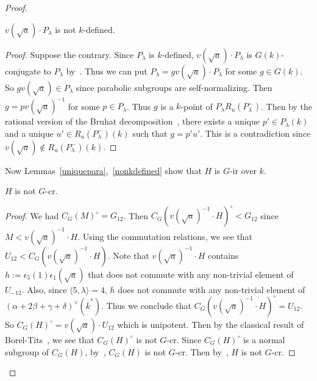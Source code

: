 \begin{proof}
\begin{lem}\label{nonkdefined}
$v(\sqrt a)\cdot P_\lambda$ is not $k$-defined.
\end{lem}
\begin{proof}
Suppose the contrary. Since $P_\lambda$ is $k$-defined, $v(\sqrt a)\cdot P_\lambda$ is $G(k)$-conjugate to $P_\lambda$ by~\cite[Thm.~20.9]{Borel-AG-book}. Thus we can put $P_\lambda=g v(\sqrt a)\cdot P_\lambda$ for some $g\in G(k)$. So $g v(\sqrt a)\in P_\lambda$ since parabolic subgroups are self-normalizing. Then $g=pv(\sqrt a)^{-1}$ for some $p\in P_\lambda$. Thus $g$ is a $k$-point of $P_\lambda R_u(P_\lambda^{-})$. Then by the rational version of the Bruhat decomposition~\cite[Thm.~21.15]{Borel-AG-book}, there exists a unique $p'\in P_\lambda(k)$ and a unique $u'\in R_u(P_\lambda^{-})(k)$ such that $g=p' u'$. This is a contradiction since $v(\sqrt a)\notin R_u(P_\lambda^{-})(k)$. 
\end{proof} 
Now Lemmas~\ref{uniquepara},~\ref{nonkdefined} show that $H$ is $G$-ir over $k$. 

\begin{lem}\label{nonG-cr}
$H$ is not $G$-cr. 
\end{lem}
\begin{proof}
We had $C_G(M)^{\circ}=G_{12}$. Then $C_G(v(\sqrt a)^{-1}\cdot H)^{\circ}<G_{12}$ since $M<v(\sqrt a)^{-1}\cdot H$. Using the commutation relations, we see that $U_{12}< C_G(v(\sqrt a)^{-1}\cdot H)$. Note that $v(\sqrt a)^{-1}\cdot H$ contains $h:=\epsilon_{5}(1)\epsilon_{1}(\sqrt a)$ that does not commute with any non-trivial element of $U_{-12}$. Also, since $\langle 5, \lambda\rangle = 4$,  $h$ does not commute with any non-trivial element of $(\alpha+2\beta+\gamma+\delta)^{\vee}(\overline k^*)$.
Thus we conclude that $C_G(v(\sqrt a)^{-1}\cdot H)^{\circ}=U_{12}$. So $C_G(H)^{\circ}=v(\sqrt a)\cdot U_{12}$ which is unipotent. Then by the classical result of Borel-Tits~\cite[Prop.~3.1]{Borel-Tits-unipotent-invent}, we see that $C_G(H)^{\circ}$ is not $G$-cr.
Since $C_G(H)^{\circ}$ is a normal subgroup of $C_G(H)$, by~\cite[Ex.~5.20]{Bate-uniform-TransAMS}, $C_G(H)$ is not $G$-cr. Then by~\cite[Cor.~3.17]{Bate-geometric-Inventione}, $H$ is not $G$-cr. 
\end{proof}
\end{proof}



  